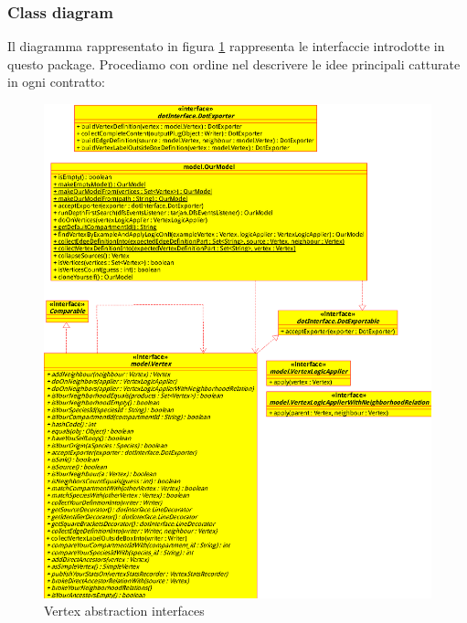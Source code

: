 \subsubsection*{Class diagram}
Il diagramma rappresentato in figura
\ref{fig:vertex-abstraction-interfaces} rappresenta le interfaccie
introdotte in questo package. Procediamo con ordine nel descrivere le
idee principali catturate in ogni contratto:

\begin{figure}
  \centering
  \includegraphics{packages/vertex-interface-class-diagram.eps}
  \caption{Vertex abstraction interfaces}
  \label{fig:vertex-abstraction-interfaces}
\end{figure}

